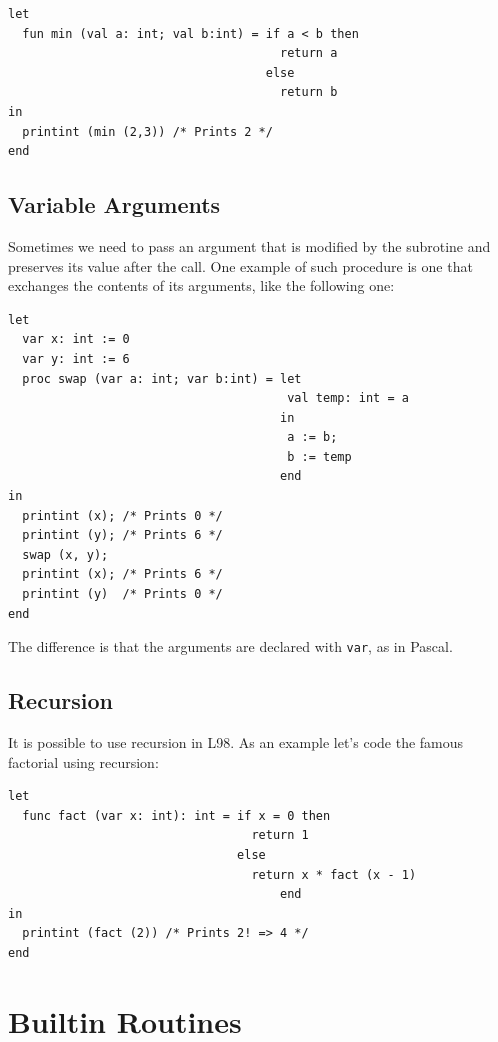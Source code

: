 \documentclass[a4paper, 11pt]{report}
\newcommand{\keyword}[1]{\texttt{#1}}
\begin{document}
\begin{lstlisting}
let
  fun min (val a: int; val b:int) = if a < b then
                                      return a
                                    else
                                      return b
in
  printint (min (2,3)) /* Prints 2 */
end
\end{lstlisting}

\subsection{Variable Arguments}
Sometimes we need to pass an argument that is modified by the subrotine and
preserves its value after the call. One example of such procedure is one that
exchanges the contents of its arguments, like the following one:

\begin{lstlisting}
let
  var x: int := 0
  var y: int := 6
  proc swap (var a: int; var b:int) = let
                                       val temp: int = a
                                      in
                                       a := b;
                                       b := temp
                                      end
in
  printint (x); /* Prints 0 */
  printint (y); /* Prints 6 */
  swap (x, y);
  printint (x); /* Prints 6 */
  printint (y)  /* Prints 0 */
end
\end{lstlisting}

The difference is that the arguments are declared with \keyword{var}, as in Pascal.

\subsection{Recursion}

It is possible to use recursion in L98. As an example let's code the
famous factorial using recursion:

\begin{lstlisting}
let
  func fact (var x: int): int = if x = 0 then
                                  return 1
                                else
                                  return x * fact (x - 1)
                                      end
in
  printint (fact (2)) /* Prints 2! => 4 */
end
\end{lstlisting}

\section{Builtin Routines}
\label{sct:builtin}
\end{document}
